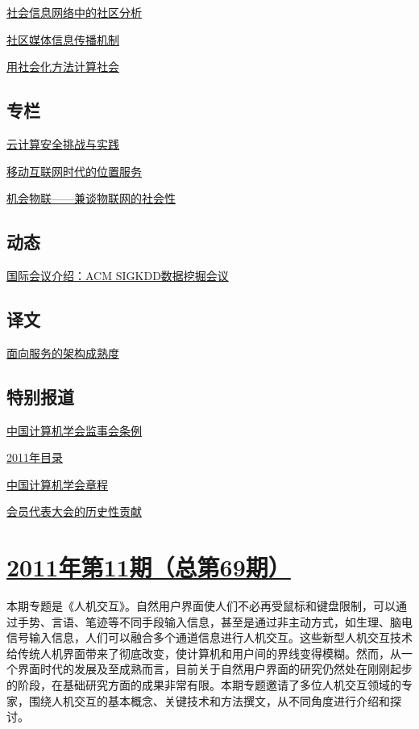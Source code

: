 \documentclass[a4paper]{article}
\begin{document}
\href{http://history.ccf.org.cn/resources/1190201776262/2012/01/06/3.pdf}{社会信息网络中的社区分析}

\href{http://history.ccf.org.cn/resources/1190201776262/2012/01/06/4.pdf}{社区媒体信息传播机制}

\href{http://history.ccf.org.cn/resources/1190201776262/2012/01/06/5.pdf}{用社会化方法计算社会}

\subsection{专栏}
\href{http://history.ccf.org.cn/resources/1190201776262/2012/01/06/9.pdf}{云计算安全挑战与实践}

\href{http://history.ccf.org.cn/resources/1190201776262/2012/01/06/7.pdf}{移动互联网时代的位置服务}

\href{http://history.ccf.org.cn/resources/1190201776262/2012/01/06/8.pdf}{机会物联——兼谈物联网的社会性}

\subsection{动态}
\href{http://history.ccf.org.cn/resources/1190201776262/2012/01/06/10.pdf}{国际会议介绍：ACM SIGKDD数据挖掘会议}

\subsection{译文}
\href{http://history.ccf.org.cn/resources/1190201776262/2012/01/06/11.pdf}{面向服务的架构成熟度}

\subsection{特别报道}
\href{http://history.ccf.org.cn/resources/1190201776262/2012/01/06/14.pdf}{中国计算机学会监事会条例}

\href{http://history.ccf.org.cn/resources/1190201776262/2012/01/06/15.pdf}{2011年目录}

\href{http://history.ccf.org.cn/resources/1190201776262/2012/01/06/13.pdf}{中国计算机学会章程}

\href{http://history.ccf.org.cn/resources/1190201776262/2012/01/06/12.pdf}{会员代表大会的历史性贡献}


\section{\href{http://history.ccf.org.cn/sites/ccf/jsjtbbd.jsp?contentId=2643122951271}{\textbf{2011年第11期（总第69期）}}}
本期专题是《人机交互》。自然用户界面使人们不必再受鼠标和键盘限制，可以通过手势、言语、笔迹等不同手段输入信息，甚至是通过非主动方式，如生理、脑电信号输入信息，人们可以融合多个通道信息进行人机交互。这些新型人机交互技术给传统人机界面带来了彻底改变，使计算机和用户间的界线变得模糊。然而，从一个界面时代的发展及至成熟而言，目前关于自然用户界面的研究仍然处在刚刚起步的阶段，在基础研究方面的成果非常有限。本期专题邀请了多位人机交互领域的专家，围绕人机交互的基本概念、关键技术和方法撰文，从不同角度进行介绍和探讨。
\end{document}
